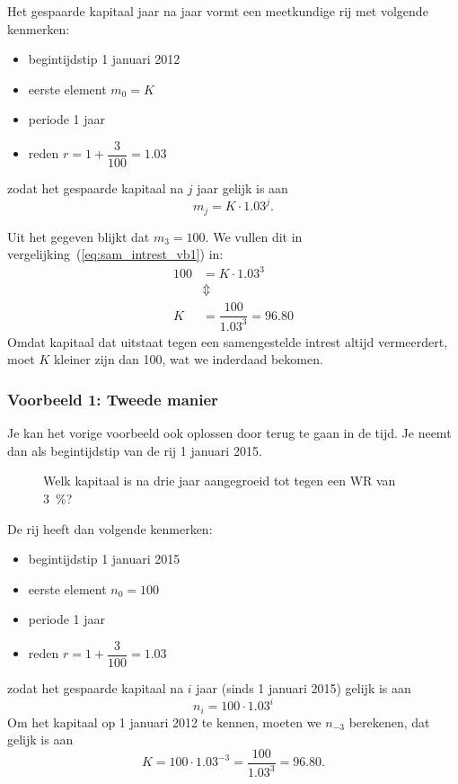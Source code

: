 Het gespaarde kapitaal jaar na jaar vormt een meetkundige rij  met volgende kenmerken:
\begin{itemize}
\item begintijdstip 1 januari 2012
\item eerste element $m_0=K$
\item periode 1 jaar
\item reden $r=1+\dfrac{3}{100}=\num{1.03}$
\end{itemize}
zodat het gespaarde kapitaal na $j$ jaar gelijk is aan 
\begin{equation}
m_j=K\cdot \num{1.03}^j.
\label{eq:sam_intrest_vb1}
\end{equation}

Uit het gegeven blijkt dat $m_3=100$. We vullen dit in vergelijking~(\ref{eq:sam_intrest_vb1}) in:
\begin{align*}
100&=K\cdot \num{1.03}^3\\
&\Updownarrow\\
K&=\dfrac{100}{\num{1.03}^3}=\num{96,80}
\end{align*}
Omdat kapitaal dat uitstaat tegen een samengestelde intrest altijd vermeerdert, moet $K$ kleiner zijn dan 100, wat we inderdaad bekomen.

\subsubsection{Voorbeeld 1: Tweede manier}
\label{vb1:2demanier}
Je kan  het vorige voorbeeld ook oplossen door terug te gaan in de tijd. Je neemt dan als begintijdstip van de rij 1 januari 2015. 
\begin{figure}[htbp]
    \centering
{}
    \caption{Welk kapitaal is na drie jaar aangegroeid tot  tegen een WR van \SI{3}{\percent}?}
    \label{fig:oef1terugtellen} 
\end{figure}
De rij heeft dan volgende kenmerken:
\begin{itemize}
\item begintijdstip 1 januari 2015
\item eerste element $n_0=100$
\item periode 1 jaar
\item reden $r=1+\dfrac{3}{100}=\num{1.03}$
\end{itemize}
zodat het gespaarde kapitaal na $i$ jaar (sinds 1 januari 2015) gelijk is aan 
\begin{equation}
n_i=100\cdot \num{1.03}^i
\end{equation}
Om het kapitaal op 1 januari 2012 te kennen, moeten we $n_{-3}$ berekenen, dat gelijk is aan 
\[
K=100\cdot \num{1.03}^{-3}=\frac{100}{\num{1.03}^{3}}=\num{96,80}.
\]



